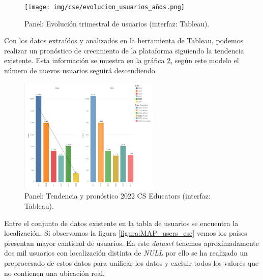 \documentclass[a4paper, 12pt]{book}
\begin{document}
\begin{figure}[ht]
    \centering
    \texttt{[image: img/cse/evolucion\_usuarios\_años.png]}
    \caption{Panel: Evolución trimestral de usuarios (interfaz: Tableau).}
    \label{figura:evo_users_trim}
\end{figure}

Con los datos extraídos y analizados en la herramienta de Tableau, podemos realizar un pronóstico de crecimiento de la plataforma siguiendo la tendencia existente. Esta información se muestra en la gráfica \ref{figura:tendencia_cse}, según este modelo el número de nuevos usuarios seguirá descendiendo.

\begin{figure}[ht]
    \centering
    \includegraphics[width=0.6\textwidth]{img/cse/Tendencia_pronostico_CsE.png}
    \caption{Panel: Tendencia y pronóstico 2022 CS Educators (interfaz: Tableau).}
    \label{figura:tendencia_cse}
\end{figure}




Entre el conjunto de datos existente en la tabla de usuarios se encuentra la localización. Si observamos la figura \ref{figura:MAP_users_cse} vemos los países presentan mayor cantidad de usuarios. En este \textit{dataset} tenemos aproximadamente dos mil usuarios con localización distinta de \emph{NULL} por ello se ha realizado un preprocesado de estos datos para unificar los datos y excluir todos los valores que no contienen una ubicación real. 
\end{document}
